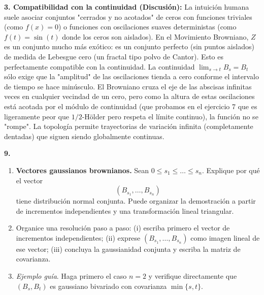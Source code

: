 \documentclass[11pt, letterpaper]{article}
\begin{document}
\begin{solucion}
    \textbf{3. Compatibilidad con la continuidad (Discusión):}
    La intuición humana suele asociar conjuntos "cerrados y no acotados" de ceros con funciones triviales (como $f(x)=0$) o funciones con oscilaciones suaves deterministas (como $f(t) = \sin(t)$ donde los ceros son aislados).
    En el Movimiento Browniano, $Z$ es un conjunto mucho más exótico: es un conjunto perfecto (sin puntos aislados) de medida de Lebesgue cero (un fractal tipo polvo de Cantor).
    Esto es perfectamente compatible con la continuidad. La continuidad $\lim_{s \to t} B_s = B_t$ sólo exige que la "amplitud" de las oscilaciones tienda a cero conforme el intervalo de tiempo se hace minúsculo. El Browniano cruza el eje de las abscisas infinitas veces en cualquier vecindad de un cero, pero como la altura de estas oscilaciones está acotada por el módulo de continuidad (que probamos en el ejercicio 7 que es ligeramente peor que $1/2$-Hölder pero respeta el límite continuo), la función no se "rompe". La topología permite trayectorias de variación infinita (completamente dentadas) que siguen siendo globalmente continuas.
\end{solucion}

\newpage

\begin{ejercicio}
    \textbf{9.} 
    \begin{enumerate}
        \item \textbf{Vectores gaussianos brownianos.} Sean $0 \le s_1 \le \dots \le s_n$. Explique por qué el vector 
        \[ (B_{s_1}, \dots, B_{s_n}) \]
        tiene distribución normal conjunta. Puede organizar la demostración a partir de incrementos independientes y una transformación lineal triangular.
        \item Organice una resolución paso a paso: (i) escriba primero el vector de incrementos independientes; (ii) exprese $(B_{s_1}, \dots, B_{s_n})$ como imagen lineal de ese vector; (iii) concluya la gaussianidad conjunta y escriba la matriz de covarianza.
        \item \textit{Ejemplo guía}. Haga primero el caso $n = 2$ y verifique directamente que $(B_s, B_t)$ es gaussiano bivariado con covarianza $\min\{s,t\}$.
    \end{enumerate}
\end{ejercicio}

\vspace{5mm}
\end{document}
